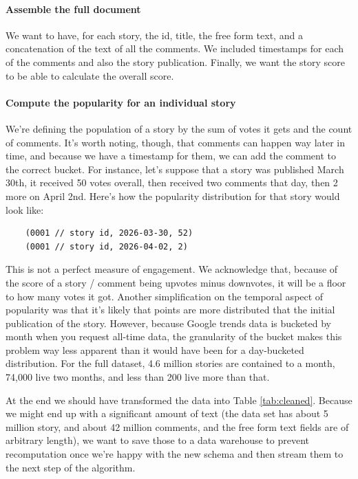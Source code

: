 \documentclass[nonacm,sigconf]{acmart}
\begin{document}
\paragraph{Assemble the full document} We want to have, for each story, the id, title, the free form text, and a concatenation of the text of all the comments. We included timestamps for each of the comments and also the story publication. Finally, we want the story score to be able to calculate the overall score.
\paragraph{Compute the popularity for an individual story} We're defining the population of a story by the sum of votes it gets and the count of comments. It's worth noting, though, that comments can happen way later in time, and because we have a timestamp for them, we can add the comment to the correct bucket. For instance, let's suppose that a story was published March 30th, it received 50 votes overall, then received two comments that day, then 2 more on April 2nd. Here's how the popularity distribution for that story would look like:

\begin{verbatim}
    (0001 // story id, 2026-03-30, 52)
    (0001 // story id, 2026-04-02, 2)
\end{verbatim}

This is not a perfect measure of engagement. We acknowledge that, because of the score of a story / comment being upvotes minus downvotes, it will be a floor to how many votes it got. Another simplification on the temporal aspect of popularity was that it's likely that points are more distributed that the initial publication of the story. However, because Google trends data is bucketed by month when you request all-time data, the granularity of the bucket makes this problem way less apparent than it would have been for a day-bucketed distribution. For the full dataset, 4.6 million stories are contained to a month, 74,000 live two months, and less than 200 live more than that.

At the end we should have transformed the data into Table \ref{tab:cleaned}. Because we might end up with a significant amount of text (the data set has about 5 million story, and about 42 million comments, and the free form text fields are of arbitrary length), we want to save those to a data warehouse to prevent recomputation once we're happy with the new schema and then stream them to the next step of the algorithm.
\end{document}

